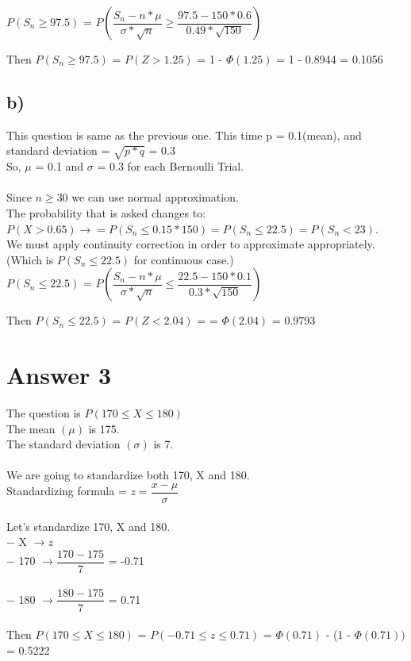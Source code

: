 \documentclass[12pt]{article}
\begin{document}
$P(S_n \geq 97.5)$ = $P(\dfrac{S_n - n*\mu}{\sigma * \sqrt{n}} \geq \dfrac{97.5 - 150*0.6}{0.49*\sqrt{150}})$

Then $P(S_n \geq 97.5)$ = $P(Z > 1.25)$ = 1 - $\Phi (1.25)$ = 1 - 0.8944 = 0.1056\\

\subsection*{b)} 

This question is same as the previous one. This time p = 0.1(mean), and standard deviation =  $\sqrt{p * q}$ = 0.3\\
So, $\mu$ = 0.1 and $\sigma$ = 0.3 for each Bernoulli Trial.\\
\\
Since $n \geq 30$ we can use normal approximation.\\
The probability that is asked changes to:\\
 $P(X > 0.65) \rightarrow = P(S_n \leq 0.15*150) = P(S_n \leq 22.5) = P(S_n < 23)$.\\
We must apply continuity correction in order to approximate appropriately. (Which is $P(S_n \leq 22.5)$ for continuous case.)\\

$P(S_n \leq 22.5)$ = $P(\dfrac{S_n - n*\mu}{\sigma * \sqrt{n}} \leq \dfrac{22.5 - 150*0.1}{0.3*\sqrt{150}})$

Then $P(S_n \leq 22.5)$ = $P(Z < 2.04)$ = = $\Phi (2.04)$ = 0.9793\\

\section*{Answer 3}
The question is $P(170 \leq X \leq 180)$\\
The mean $(\mu)$ is 175.\\
The standard deviation $(\sigma)$ is 7.\\
\\
We are going to standardize both 170, X and 180.\\
Standardizing formula = $z = \dfrac{x - \mu}{\sigma}$\\
\\
Let's standardize 170, X and 180.\\
$-$ X $\rightarrow z$\\
$-$ 170 $\rightarrow \dfrac{170 - 175}{7}$ = -0.71\\
\\
$-$ 180 $\rightarrow \dfrac{180 - 175}{7}$ = 0.71\\
\\
Then $P(170 \leq X \leq 180)$ = $P(-0.71 \leq z \leq 0.71)$ = $\Phi (0.71)$ - (1 - $\Phi (0.71))$ = 0.5222\\
\end{document}
